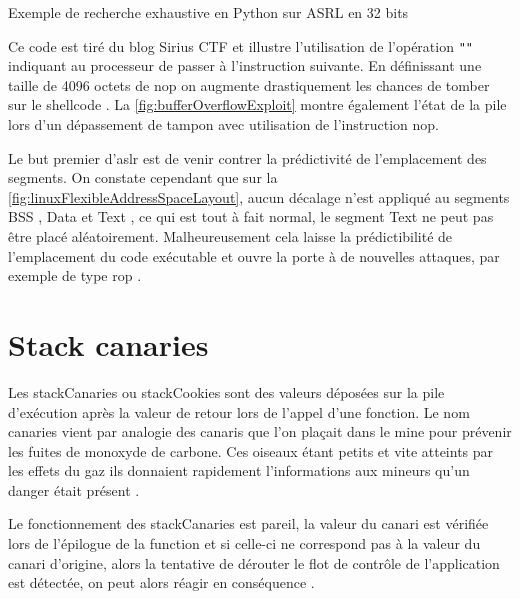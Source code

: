 \begin{listing}
	\caption{Exemple de recherche exhaustive en Python sur ASRL en 32 bits}
	\label{lst:bruteforce_aslr}
\end{listing}

Ce code est tiré du blog \og Sirius CTF \fg \cite{ExploitingSimpleBufferOverflow} et illustre l'utilisation de l'opération \texttt{""} indiquant au processeur de passer à l'instruction suivante. En définissant une taille de 4096 octets de \og \gls{nop} \fg on augmente drastiquement les chances de tomber sur le \og shellcode \fg. La \autoref{fig:bufferOverflowExploit} montre également l'état de la pile lors d'un dépassement de tampon avec utilisation de l'instruction \gls{nop}.

Le but premier d'\gls{aslr} est de venir contrer la prédictivité de l'emplacement des segments. On constate cependant que sur la \autoref{fig:linuxFlexibleAddressSpaceLayout}, aucun décalage n'est appliqué au segments \og BSS \fg, \og Data \fg et \og Text \fg, ce qui est tout à fait normal, le segment \og Text \fg ne peut pas être placé aléatoirement. Malheureusement cela laisse la prédictibilité de l'emplacement du code exécutable et ouvre la porte à de nouvelles attaques, par exemple de type \og \gls{rop} \fg.

\vfill

\section{Stack canaries}

Les \og \gls{stackCanaries} \fg ou \og \gls{stackCookies} \fg sont des valeurs déposées sur la pile d'exécution après la valeur de retour lors de l'appel d'une fonction. Le nom \og canaries \fg vient par analogie des canaris que l'on plaçait dans le mine pour prévenir les fuites de monoxyde de carbone. Ces oiseaux étant petits et vite atteints par les effets du gaz ils donnaient rapidement l'informations aux mineurs qu'un danger était présent \cite{StackCanaries, SentinelSpecies}.

Le fonctionnement des \og \gls{stackCanaries} \fg est pareil, la valeur du canari est vérifiée lors de l'épilogue de la function et si celle-ci ne correspond pas à la valeur du canari d'origine, alors la tentative de dérouter le flot de contrôle de l'application est détectée, on peut alors réagir en conséquence \cite{EpiloguesCanariesBufferOverflows}.


